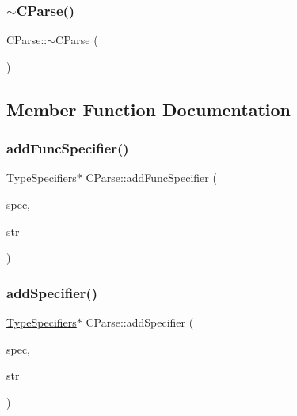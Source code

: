 \mbox{\label{class_c_parse_a432a5efb7cef89119725886d95a7e99a}} 
\subsubsection{\texorpdfstring{$\sim$CParse()}{~CParse()}}
{\footnotesize\ttfamily C\+Parse\+::$\sim$\+C\+Parse (\begin{DoxyParamCaption}\item[{void}]{ }\end{DoxyParamCaption})}



\subsection{Member Function Documentation}
\mbox{\label{class_c_parse_a41a5497a25d4911b58c1afdcbbaf73e9}} 
\subsubsection{\texorpdfstring{addFuncSpecifier()}{addFuncSpecifier()}}
{\footnotesize\ttfamily \mbox{\hyperlink{struct_type_specifiers}{Type\+Specifiers}}$\ast$ C\+Parse\+::add\+Func\+Specifier (\begin{DoxyParamCaption}\item[{\mbox{\hyperlink{struct_type_specifiers}{Type\+Specifiers}} $\ast$}]{spec,  }\item[{string $\ast$}]{str }\end{DoxyParamCaption})}

\mbox{\label{class_c_parse_a594d76f7b8af0948928585d112412e34}} 
\subsubsection{\texorpdfstring{addSpecifier()}{addSpecifier()}}
{\footnotesize\ttfamily \mbox{\hyperlink{struct_type_specifiers}{Type\+Specifiers}}$\ast$ C\+Parse\+::add\+Specifier (\begin{DoxyParamCaption}\item[{\mbox{\hyperlink{struct_type_specifiers}{Type\+Specifiers}} $\ast$}]{spec,  }\item[{string $\ast$}]{str }\end{DoxyParamCaption})}

